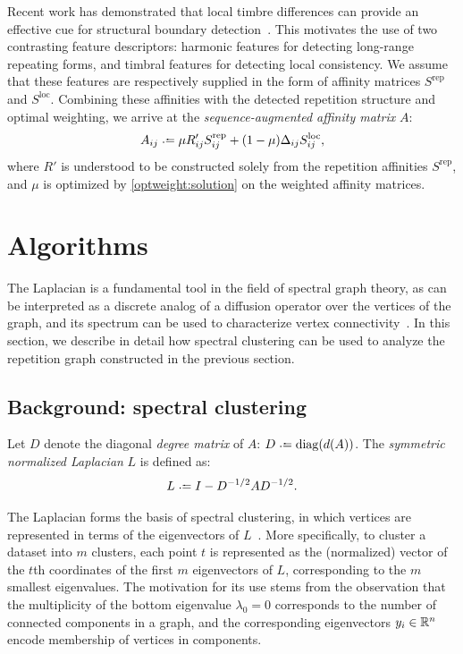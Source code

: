 \documentclass{article}
\begin{document}
Recent work has demonstrated that local timbre differences 
can provide an effective cue for structural boundary
detection~\cite{kaiser2013simple}.  This motivates the use of two contrasting feature
descriptors: harmonic features for detecting long-range repeating forms, and timbral
features for detecting local consistency.  We assume that these features are
respectively supplied in the form of affinity matrices $S^\text{rep}$ and
$S^\text{loc}$.  Combining these affinities with the detected repetition structure and
optimal weighting, we arrive at the \emph{sequence-augmented affinity matrix} $A$:
\begin{equation}
A_{ij} \defeq \mu R'_{ij} S^\text{rep}_{ij} + (1-\mu) \Delta_{ij} S^\text{loc}_{ij},\label{saam}
\end{equation}
where $R'$ is understood to be
constructed solely from the repetition affinities $S^\text{rep}$, and $\mu$ is
optimized by \eqref{optweight:solution} on the weighted affinity matrices.


\section{Algorithms}

The Laplacian is a fundamental tool in the field of spectral graph
theory, as can be interpreted as a discrete analog of a diffusion operator over the
vertices of the graph, and its spectrum can be used to characterize 
vertex connectivity~\cite{chung1997spectral}.  In this section, we describe in detail
how spectral clustering can be used to analyze the repetition graph constructed in the
previous section.

\subsection{Background: spectral clustering}
Let $D$ denote the diagonal \emph{degree matrix} of $A$: $D \defeq \diag(d(A))$.  
The \emph{symmetric normalized Laplacian} $L$ is defined as:
\begin{equation}
L \defeq I - D^{-1/2} A D^{-1/2}.\label{symlaplacian}
\end{equation}

The Laplacian forms the basis of spectral clustering, in which vertices are
represented in terms of the eigenvectors of $L$~\cite{von2007tutorial}.  More
specifically, to cluster a dataset into $m$ clusters, each point $t$ is represented as
the (normalized) vector of the $t$th coordinates of the first $m$ eigenvectors of $L$,
corresponding to the $m$ smallest eigenvalues.
The motivation for its use stems from the observation that the multiplicity of the bottom
eigenvalue $\lambda_0 = 0$ corresponds to the number of connected components in a
graph, and the corresponding eigenvectors $y_i \in \mathbb{R}^n$ encode membership of vertices
in components.
\end{document}
